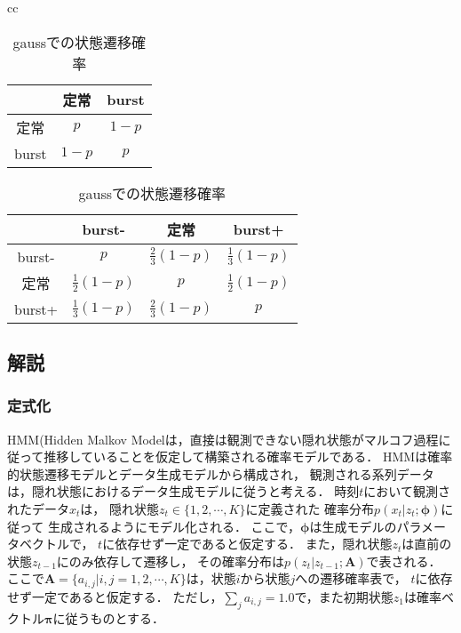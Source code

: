 \begin{table}[htbp]
\begin{center}
\begin{tabular}{cc}

\begin{minipage}{0.5\hsize}
\begin{center}
\caption{exp, poisson, binomでの状態遷移確率\label{tbl:initProb}}
{\small
\begin{tabular}{ccc}
\hline
&定常&burst\\
\hline
定常  & $p$   & $1-p$ \\
burst & $1-p$ & $p$   \\
\hline
\end{tabular} 
}
\end{center}
\end{minipage}

\begin{minipage}{0.5\hsize}
\begin{center}
\caption{gaussでの状態遷移確率\label{tbl:initProb}}
{\small
\begin{tabular}{cccc}
\hline
& burst- &定常&burst+\\
\hline
burst- & $p$                & $\frac{2}{3}(1-p)$ & $\frac{1}{3}(1-p)$ \\
定常   & $\frac{1}{2}(1-p)$ & $p$                & $\frac{1}{2}(1-p)$ \\
burst+ & $\frac{1}{3}(1-p)$ & $\frac{2}{3}(1-p)$ & $p$                \\
\hline
\end{tabular} 
}
\end{center}
\end{minipage}

\end{tabular} 
\end{center}
\end{table} 



\subsection{解説}
\subsubsection{定式化}
HMM(Hidden Malkov Modelは，直接は観測できない隠れ状態がマルコフ過程に従って推移していることを仮定して構築される確率モデルである．
HMMは確率的状態遷移モデルとデータ生成モデルから構成され，
観測される系列データは，隠れ状態におけるデータ生成モデルに従うと考える．
時刻$t$において観測されたデータ$x_t$は，
隠れ状態$z_t\in \{1,2,\cdots,K\}$に定義された
確率分布$p(x_t|z_t;\boldsymbol{\phi})$に従って
生成されるようにモデル化される．
ここで，$\boldsymbol{\phi}$は生成モデルのパラメータベクトルで，
$t$に依存せず一定であると仮定する．
また，隠れ状態$z_t$は直前の状態$z_{t-1}$にのみ依存して遷移し，
その確率分布は$p(z_t|z_{t-1};\mathbf{A})$で表される．
ここで$\mathbf{A}=\{a_{i,j}|i,j=1,2,\cdots,K\}$は，状態$i$から状態$j$への遷移確率表で，
$t$に依存せず一定であると仮定する．
ただし，$\sum_j a_{i,j}=1.0$で，また初期状態$z_1$は確率ベクトル$\boldsymbol{\pi}$に従うものとする．

